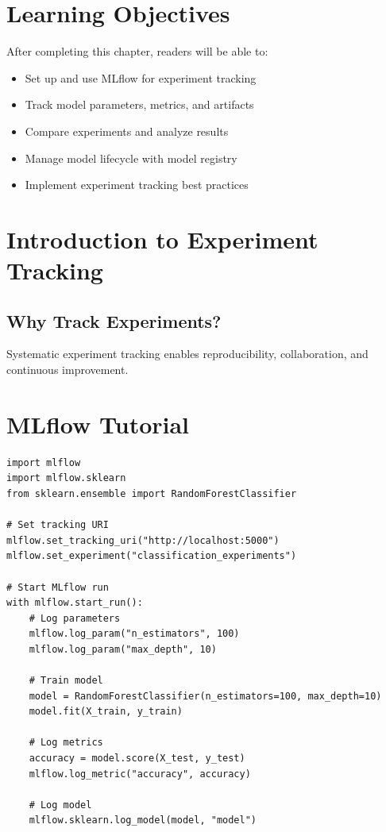 \section{Learning Objectives}

After completing this chapter, readers will be able to:
\begin{itemize}
    \item Set up and use MLflow for experiment tracking
    \item Track model parameters, metrics, and artifacts
    \item Compare experiments and analyze results
    \item Manage model lifecycle with model registry
    \item Implement experiment tracking best practices
\end{itemize}

\section{Introduction to Experiment Tracking}

\subsection{Why Track Experiments?}

Systematic experiment tracking enables reproducibility, collaboration, and continuous improvement.

\section{MLflow Tutorial}

\begin{lstlisting}[style=python]
import mlflow
import mlflow.sklearn
from sklearn.ensemble import RandomForestClassifier

# Set tracking URI
mlflow.set_tracking_uri("http://localhost:5000")
mlflow.set_experiment("classification_experiments")

# Start MLflow run
with mlflow.start_run():
    # Log parameters
    mlflow.log_param("n_estimators", 100)
    mlflow.log_param("max_depth", 10)

    # Train model
    model = RandomForestClassifier(n_estimators=100, max_depth=10)
    model.fit(X_train, y_train)

    # Log metrics
    accuracy = model.score(X_test, y_test)
    mlflow.log_metric("accuracy", accuracy)

    # Log model
    mlflow.sklearn.log_model(model, "model")
\end{lstlisting}

